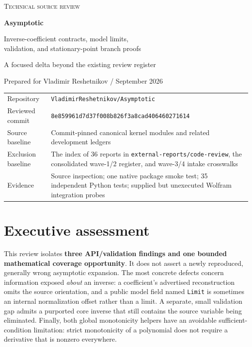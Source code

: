 \documentclass[11pt,letterpaper]{article}
\newcommand{\code}[1]{\nolinkurl{#1}}
\newcommand{\repo}{\texttt{VladimirReshetnikov/Asymptotic}}
\newcommand{\commit}{\texttt{8e859961d7d37f008b826f3a8cad406460271614}}
\begin{document}
\begin{center}
{\Large\scshape Technical source review}\par
\vspace{8pt}
{\huge\bfseries Asymptotic}\par
\vspace{7pt}
{\Large Inverse-coefficient contracts, model limits,\\
validation, and stationary-point branch proofs}\par
\vspace{12pt}
{\large A focused delta beyond the existing review register}\par
\vspace{12pt}
Prepared for Vladimir Reshetnikov \quad /  September 2026
\end{center}

\vspace{6pt}
\begin{tabularx}{\linewidth}{@{}lY@{}}
\toprule
Repository & \repo\\
Reviewed commit & \commit\\
Source baseline & Commit-pinned canonical kernel modules and related development ledgers\\
Exclusion baseline & The index of 36 reports in \code{external-reports/code-review}, the consolidated wave-1/2 register, and wave-3/4 intake crosswalks\\
Evidence & Source inspection; one native package smoke test; 35 independent Python tests; supplied but unexecuted Wolfram integration probes\\
\bottomrule
\end{tabularx}

\section*{Executive assessment}
This review isolates \textbf{three API/validation findings and one bounded mathematical coverage opportunity}. It does not assert a newly reproduced, generally wrong asymptotic expansion. The most concrete defects concern information exposed \emph{about} an inverse: a coefficient's advertised reconstruction omits the source orientation, and a public model field named \code{Limit} is sometimes an internal normalization offset rather than a limit. A separate, small validation gap admits a purported core inverse that still contains the source variable being eliminated. Finally, both global monotonicity helpers have an avoidable sufficient-condition limitation: strict monotonicity of a polynomial does not require a derivative that is nonzero everywhere.
\end{document}
